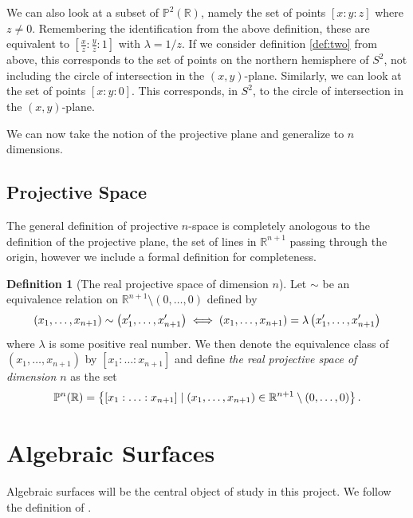 \documentclass{article}
\theoremstyle{definition}
\newtheorem{defn}{Definition}
\theoremstyle{plain}
\newcommand{\proj}{\ensuremath{\mathbb{P}}} %
\newcommand{\R}{\ensuremath{\mathbb{R}}}    %
\newcommand{\projp}[3]{\ensuremath{[ #1 : #2 : #3 ]}}
\begin{document}
We can also look at a subset of $\proj^2(\R)$, namely the set of points
$\projp{x}{y}{z}$ where $z \neq 0$. Remembering the identification from the
above definition, these are equivalent to $\projp{\frac{x}{z}}{\frac{y}{z}}{1}$
with $\lambda = 1 / z$. If we consider definition \ref{def:two} from above,
this corresponds to the set of points on the northern hemisphere of $S^2$, not
including the circle of intersection in the $(x,y)$-plane. Similarly, we can
look at the set of points $\projp{x}{y}{0}$. This corresponds, in $S^2$, to the
circle of intersection in the $(x, y)$-plane. 

We can now take the notion of the projective plane and generalize to $n$
dimensions.
\subsection{Projective Space}
\label{sub:projective_space}

The general definition of projective $n$-space is completely anologous to the
definition of the projective plane, the set of lines in $\R^{n+1}$ passing
through the origin, however we include a formal definition for completeness.

\begin{defn}[The real projective space of dimension $n$]\index{$\proj^n(\R)$}

    Let $\sim$ be an equivalence relation on $\R^{n+1}\setminus \left( 0,
    \ldots, 0 \right)$ defined by
    \begin{equation}
        \notag
        \left( x_1, \ldots, x_{n+1} \right) \sim \left( x_1', \ldots, x_{n+1}' \right) 
        \iff \left( x_1, \ldots, x_{n+1} \right) = \lambda \left( x_1', \ldots, x_{n+1}' \right)
    \end{equation} 
    where $\lambda$ is some positive real number. We then denote the
    equivalence class of $\left( x_1, \ldots, x_{n+1} \right)$ by
    $\projp{x_1}{\ldots}{x_{n+1}}$ and define \emph{the real projective space
    of dimension $n$} as the set
    \begin{equation}
        \notag
        \proj^n(\R) = \left\{ \projp{x_1}{\ldots}{x_{n+1}} \mid \left( x_1, \ldots, x_{n+1} \right) 
        \in \R^{n+1} \setminus \left( 0, \ldots, 0 \right) \right\}.
    \end{equation}
\end{defn}

\section{Algebraic Surfaces}
\label{sec:algebraic_surfaces}

Algebraic surfaces will be the central object of study in this project. We
follow the definition of \cite{cite}.

\printindex
\printbibliography
\end{document}
